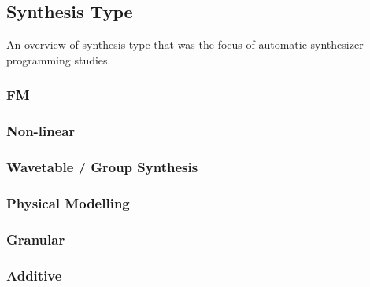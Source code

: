 \subsection{Synthesis Type}
An overview of synthesis type that was the focus of automatic synthesizer programming studies.

\subsubsection{FM}
\cite{justice1979analytic}\cite{beauchamp1982synthesis}\cite{payne1987microcomputer}\cite{horner1993machine}\cite{horner1996double}\cite{tan1996automated}\cite{delprat1997global}\cite{lim1999performance}\cite{tan2003automated}
\cite{mitchell2005frequency}\cite{mitchell2007evolutionary}\cite{clement2011automatic}\cite{roth2011comparison}\cite{macret2012automatic}\cite{hamadicharef2012intelligent}\cite{barkan2019deep}

\subsubsection{Non-linear}
\cite{beauchamp1982synthesis}\cite{delprat1990parameter}

\subsubsection{Wavetable / Group Synthesis}
\cite{horner1993methods}\cite{horner1995wavetable}\cite{horner1995envelope}\cite{horner1996computation}\cite{horner1996piecewise}\cite{cheung1996group}\cite{oates1997analytical}\cite{horner1998modeling}\cite{lee1999modeling}\cite{so2002wavetable}

\subsubsection{Physical Modelling}
\cite{vuori1993parameter}\cite{erkut2000extraction}\cite{liang2000recurrent}\cite{nackaerts2001parameter}\cite{riionheimo2003parameter}

\subsubsection{Granular}
\cite{fujinaga1994genetic}\cite{johnson1999exploring}

\subsubsection{Additive}
\cite{ethington1994seawave}\cite{horner1995envelope}\cite{horner1996piecewise}\cite{johnson2006timbre}\cite{mintz2007toward}

